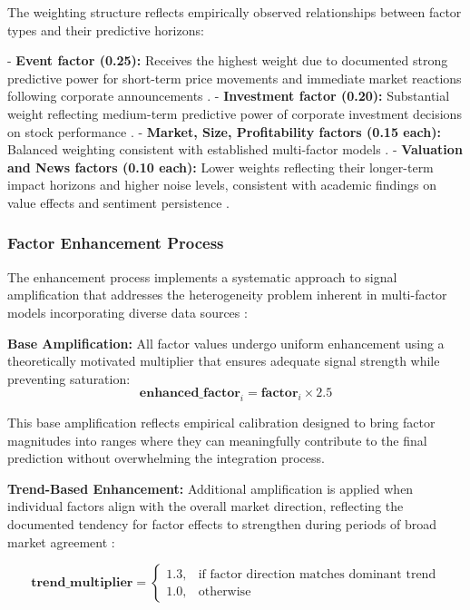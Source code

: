 \documentclass[3p,times,procedia]{elsarticle}
\begin{document}
The weighting structure reflects empirically observed relationships between factor types and their predictive horizons:

- \textbf{Event factor (0.25):} Receives the highest weight due to documented strong predictive power for short-term price movements and immediate market reactions following corporate announcements \cite{Ding2015,Daniel1998}.
- \textbf{Investment factor (0.20):} Substantial weight reflecting medium-term predictive power of corporate investment decisions on stock performance \cite{Daniel1998}.
- \textbf{Market, Size, Profitability factors (0.15 each):} Balanced weighting consistent with established multi-factor models \cite{FAMA1993,Carhart1997}.
- \textbf{Valuation and News factors (0.10 each):} Lower weights reflecting their longer-term impact horizons and higher noise levels, consistent with academic findings on value effects and sentiment persistence \cite{Rosenberg1985,TETLOCK2007}.

\subsubsection{{Factor Enhancement Process}}

The enhancement process implements a systematic approach to signal amplification that addresses the heterogeneity problem inherent in multi-factor models incorporating diverse data sources \cite{Harvey2016}:

\textbf{Base Amplification:}
All factor values undergo uniform enhancement using a theoretically motivated multiplier that ensures adequate signal strength while preventing saturation:
\begin{equation}
\textbf{enhanced\_factor}_i = \textbf{factor}_i \times 2.5
\end{equation}

This base amplification reflects empirical calibration designed to bring factor magnitudes into ranges where they can meaningfully contribute to the final prediction without overwhelming the integration process.

\textbf{Trend-Based Enhancement:}
Additional amplification is applied when individual factors align with the overall market direction, reflecting the documented tendency for factor effects to strengthen during periods of broad market agreement \cite{Lo2004}:

\begin{equation}
\textbf{trend\_multiplier} = 
\begin{cases} 
1.3, & \text{if factor direction matches dominant trend} \\
1.0, & \text{otherwise}
\end{cases}
\end{equation}
\end{document}
